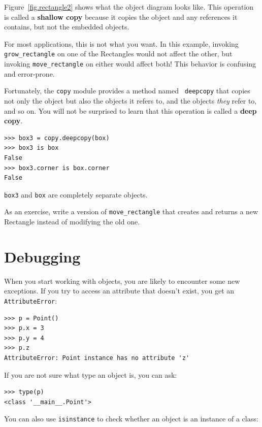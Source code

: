 \documentclass[10pt]{book}
\begin{document}
Figure~\ref{fig.rectangle2} shows what the object diagram looks like.
This operation is called a {\bf shallow copy} because it copies the
object and any references it contains, but not the embedded objects.

For most applications, this is not what you want.  In this example,
invoking \verb"grow_rectangle" on one of the Rectangles would not
affect the other, but invoking \verb"move_rectangle" on either would
affect both!  This behavior is confusing and error-prone.

Fortunately, the {\tt copy} module provides a method named {\tt
deepcopy} that copies not only the object but also 
the objects it refers to, and the objects {\em they} refer to,
and so on.
You will not be surprised to learn that this operation is
called a {\bf deep copy}.

\begin{verbatim}
>>> box3 = copy.deepcopy(box)
>>> box3 is box
False
>>> box3.corner is box.corner
False
\end{verbatim}
%
{\tt box3} and {\tt box} are completely separate objects.

As an exercise, write a version of \verb"move_rectangle" that creates and
returns a new Rectangle instead of modifying the old one.


\section{Debugging}
\label{hasattr}

When you start working with objects, you are likely to encounter
some new exceptions.  If you try to access an attribute
that doesn't exist, you get an {\tt AttributeError}:

\begin{verbatim}
>>> p = Point()
>>> p.x = 3
>>> p.y = 4
>>> p.z
AttributeError: Point instance has no attribute 'z'
\end{verbatim}
%
If you are not sure what type an object is, you can ask:

\begin{verbatim}
>>> type(p)
<class '__main__.Point'>
\end{verbatim}
%
You can also use {\tt isinstance} to check whether an object
is an instance of a class:
\end{document}
